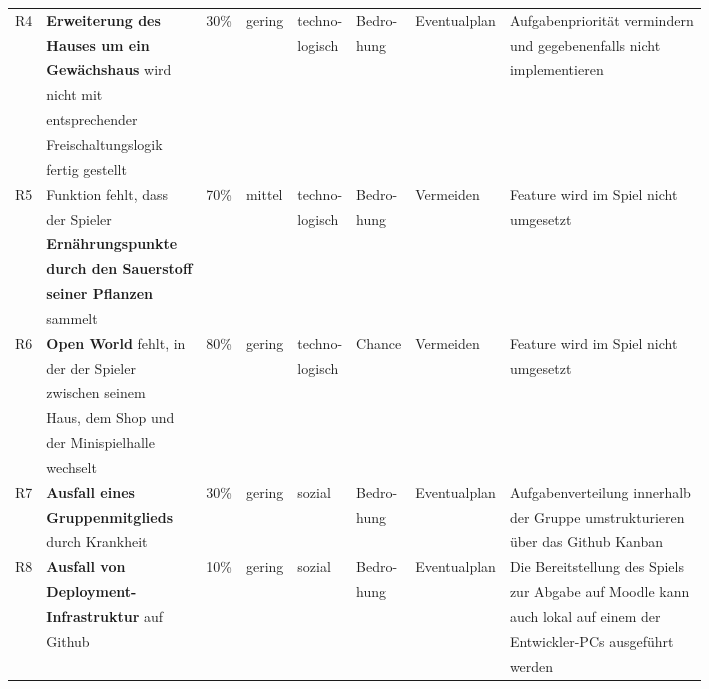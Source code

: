 \begin{table}[H]
\begin{tabular}{|c|l|l|l|l|l|l|l|}
        \hline
        R4 & \textbf{Erweiterung des} & 30\% & gering & techno- & Bedro- & Eventualplan & Aufgabenpriorität vermindern \\
        & \textbf{Hauses um ein} &  &  & logisch & hung&  & und gegebenenfalls nicht \\
        & \textbf{Gewächshaus} wird &  &  & & &  & implementieren \\
        & nicht mit &  &  &  &  & & \\
        & entsprechender &  &  &  &&  &  \\
        & Freischaltungslogik &  &  &&  &  &  \\
        & fertig gestellt &  &  &  & & &  \\
        \hline
        R5 & Funktion fehlt, dass & 70\% & mittel & techno- & Bedro- & Vermeiden & Feature wird im Spiel nicht \\
        & der Spieler &  &  & logisch &hung  &  &umgesetzt \\
        & \textbf{Ernährungspunkte} &&  &  &  &  &  \\
        & \textbf{durch den Sauerstoff} &&  &  &  &  &  \\
        & \textbf{seiner Pflanzen} &  &  &&  &  &  \\
        & sammelt &  &  &  &  &  &\\
        \hline
        R6 & \textbf{Open World} fehlt, in & 80\% & gering & techno- & Chance & Vermeiden &  Feature wird im Spiel nicht \\
        & der der Spieler &  &  & logisch& &  & umgesetzt \\
        & zwischen seinem &  &  &  &&  &  \\
        & Haus, dem Shop und &  &  &&  &  &  \\
        & der Minispielhalle &  &  & & &  &  \\
        & wechselt &  &  &  &  & & \\
        \hline
        R7 & \textbf{Ausfall eines} & 30\% & gering & sozial & Bedro- & Eventualplan & Aufgabenverteilung innerhalb \\
        & \textbf{Gruppenmitglieds} & & &  & hung &  & der Gruppe umstrukturieren \\
        & durch Krankheit &  &  &  & & & über das Github Kanban \\
        \hline
        R8 & \textbf{Ausfall von} & 10\% & gering & sozial & Bedro- & Eventualplan & Die Bereitstellung des Spiels \\
        & \textbf{Deployment-} &  &  && hung &  & zur Abgabe auf Moodle kann \\
        & \textbf{Infrastruktur} auf & & &  &  &  & auch lokal auf einem der \\
        & Github &  &  &  & & & Entwickler-PCs ausgeführt \\
        &  &  &  &  & & & werden \\
        \hline
    \end{tabular}
\end{table}



